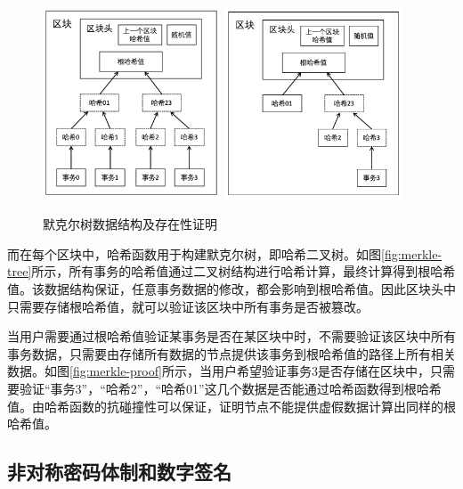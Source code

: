 \begin{figure}
  \centering%
    {\includegraphics[width=150pt]{figures/merkle-tree.png}}%
  \hspace{2em}%
      {\includegraphics[width=150pt]{figures/merkle-proof.png}}
  \caption{默克尔树数据结构及存在性证明}
  \label{fig:merkle}
\end{figure}

而在每个区块中，哈希函数用于构建默克尔树，即哈希二叉树。如图\ref{fig:merkle-tree}所示，所有事务的哈希值通过二叉树结构进行哈希计算，最终计算得到根哈希值。该数据结构保证，任意事务数据的修改，都会影响到根哈希值。因此区块头中只需要存储根哈希值，就可以验证该区块中所有事务是否被篡改。

当用户需要通过根哈希值验证某事务是否在某区块中时，不需要验证该区块中所有事务数据，只需要由存储所有数据的节点提供该事务到根哈希值的路径上所有相关数据。如图\ref{fig:merkle-proof}所示，当用户希望验证事务3是否存储在区块中，只需要验证“事务3”，“哈希2”，“哈希01”这几个数据是否能通过哈希函数得到根哈希值。由哈希函数的抗碰撞性可以保证，证明节点不能提供虚假数据计算出同样的根哈希值。

\subsection{非对称密码体制和数字签名}

